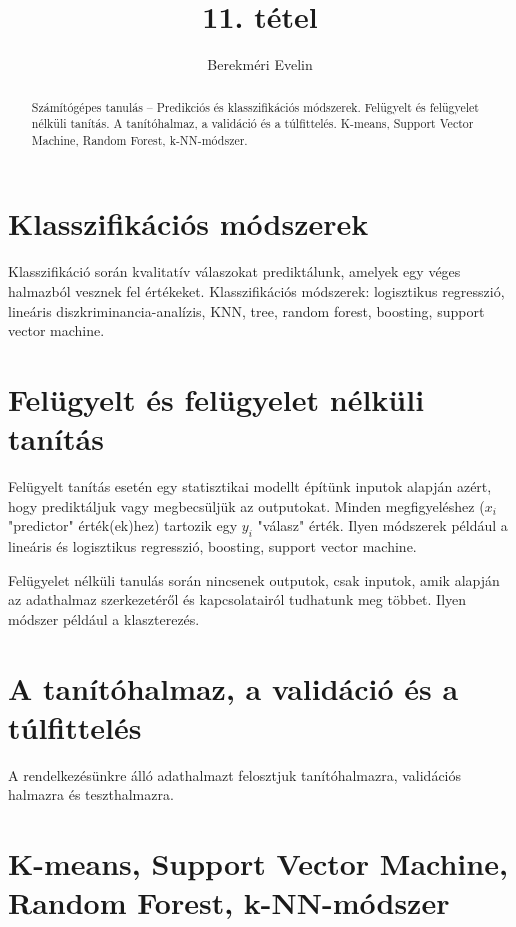 \documentclass[12pt]{article}
\theoremstyle{plain}
\begin{document}
\title{\textbf{11. tétel}}
\author{Berekméri Evelin}

\maketitle


\newpage
\begin{abstract}

Számítógépes tanulás – Predikciós és klasszifikációs módszerek. Felügyelt és felügyelet nélküli tanítás. A tanítóhalmaz, a validáció és a túlfittelés. K-means, Support Vector Machine, Random Forest, k-NN-módszer.
\end{abstract}

\section*{Klasszifikációs módszerek}
Klasszifikáció során kvalitatív válaszokat prediktálunk, amelyek egy véges halmazból vesznek fel értékeket. %
Klasszifikációs módszerek: logisztikus regresszió, lineáris diszkriminancia-analízis, KNN, tree, random forest, boosting, support vector machine. 

\section*{Felügyelt és felügyelet nélküli tanítás}
Felügyelt tanítás esetén egy statisztikai modellt építünk inputok alapján azért, hogy prediktáljuk vagy megbecsüljük az outputokat. Minden megfigyeléshez ($x_i$ "predictor" érték(ek)hez) tartozik egy $ y_i $ "válasz" érték.  Ilyen módszerek például a lineáris és logisztikus regresszió, boosting, support vector machine.  

Felügyelet nélküli tanulás során nincsenek outputok, csak inputok, amik alapján az adathalmaz szerkezetéről és kapcsolatairól tudhatunk meg többet. Ilyen módszer például a klaszterezés. 

\section*{A tanítóhalmaz, a validáció és a túlfittelés}
A rendelkezésünkre álló adathalmazt felosztjuk tanítóhalmazra, validációs halmazra és teszthalmazra. 

\section*{K-means, Support Vector Machine, Random Forest, k-NN-módszer}

\begin{thebibliography}



\end{thebibliography}
\end{document}
